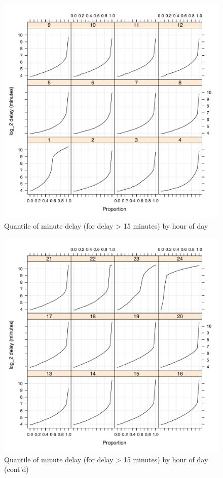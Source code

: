 \documentclass[letterpaper,10pt,english]{sphinxmanual}
\begin{document}
\begin{figure}[htbp]
\centering

\includegraphics{quantiles_by_hr_1.pdf}
\caption{Quantile of minute delay (for delay \textgreater{} 15 minutes) by hour of day}\end{figure}
\begin{figure}[htbp]
\centering

\includegraphics{quantiles_by_hr_2.pdf}
\caption{Quantile of minute delay (for delay \textgreater{} 15 minutes) by hour of day (cont'd)}\end{figure}
\end{document}
